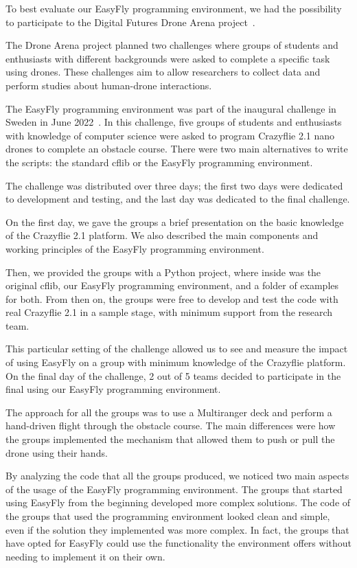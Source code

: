 To best evaluate our EasyFly programming environment, we had the possibility to participate to the Digital Futures Drone Arena project~\cite{dronearena}.

The Drone Arena project planned two challenges where groups of students and enthusiasts with different backgrounds were asked to complete a specific task using drones.
These challenges aim to allow researchers to collect data and perform studies about human-drone interactions.

The EasyFly programming environment was part of the inaugural challenge in Sweden in June 2022~\cite{dronearenaChallenge}. 
In this challenge, five groups of students and enthusiasts with knowledge of computer science were asked to program Crazyflie 2.1 nano drones to complete an obstacle course.
There were two main alternatives to write the scripts: the standard cflib or the EasyFly programming environment. 

The challenge was distributed over three days; the first two days were dedicated to development and testing, and the last day was dedicated to the final challenge.

On the first day, we gave the groups a brief presentation on the basic knowledge of the Crazyflie 2.1 platform. 
We also described the main components and working principles of the EasyFly programming environment.

Then, we provided the groups with a Python project, where inside was the original cflib, our EasyFly programming environment, and a folder of examples for both.
From then on, the groups were free to develop and test the code with real Crazyflie 2.1 in a sample stage, with minimum support from the research team.

This particular setting of the challenge allowed us to see and measure the impact of using EasyFly on a group with minimum knowledge of the Crazyflie platform. 
On the final day of the challenge, 2 out of 5 teams decided to participate in the final using our EasyFly programming environment. 

The approach for all the groups was to use a Multiranger deck and perform a hand-driven flight through the obstacle course.
The main differences were how the groups implemented the mechanism that allowed them to push or pull the drone using their hands.

By analyzing the code that all the groups produced, we noticed two main aspects of the usage of the EasyFly programming environment.
The groups that started using EasyFly from the beginning developed more complex solutions.
The code of the groups that used the programming environment looked clean and simple, even if the solution they implemented was more complex.
In fact, the groups that have opted for EasyFly could use the functionality the environment offers without needing to implement it on their own.

